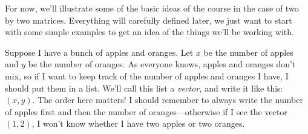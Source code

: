 {For now, we'll illustrate some of  the basic ideas of the course in the case of two by two matrices.  Everything will carefully defined later, we just want
to start with some simple examples to get an idea of the things we'll be working with.

}









\begin{example}
Suppose I have a bunch of apples and oranges.  Let $x$ be the number of apples  and $y$ be the number of oranges.  As everyone knows, apples and oranges don't mix, so if I want to keep track of the number of apples and oranges I have, I should put them in a list.  We'll call this list a \emph{vector,} and write it like this: $(x,y)$.  The order here matters!  I should remember to always write the number of apples first and then the number of oranges---otherwise if I see the vector $(1,2)$, I won't know whether I have two apples or two oranges.
\end{example}

